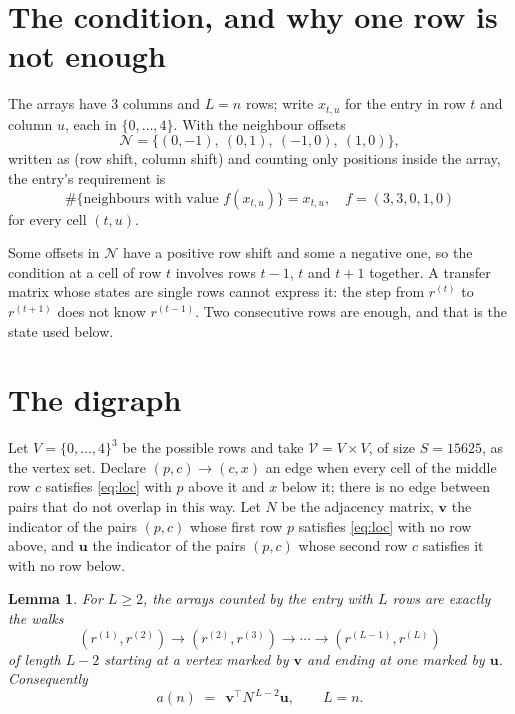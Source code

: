 \documentclass[11pt,a4paper]{article}
\theoremstyle{plain}
\newtheorem{lemma}[theorem]{Lemma}
\theoremstyle{definition}
\begin{document}
\section{The condition, and why one row is not enough}

The arrays have $3$ columns and $L=n$ rows; write $x_{t,u}$ for the entry in
row $t$ and column $u$, each in $\{0,\dots,4\}$. With the neighbour offsets
\[
\mathcal N=\{(0,-1),\ (0,1),\ (-1,0),\ (1,0)\},
\]
written as (row shift, column shift) and counting only positions inside the array, the
entry's requirement is
\begin{equation}\label{eq:loc}
\#\{\text{neighbours with value }f(x_{t,u})\}=x_{t,u},\quad f=(3,3,0,1,0)
\end{equation}
for every cell $(t,u)$.

Some offsets in $\mathcal N$ have a positive row shift and some a negative one, so the
condition at a cell of row $t$ involves rows $t-1$, $t$ and $t+1$ together. A transfer
matrix whose states are single rows cannot express it: the step from $r^{(t)}$ to
$r^{(t+1)}$ does not know $r^{(t-1)}$. Two consecutive rows are enough, and that is
the state used below.

\section{The digraph}

Let $V=\{0,\dots,4\}^{3}$ be the possible rows and take
$\mathcal V=V\times V$, of size $S=15625$, as the vertex set. Declare $(p,c)\to(c,x)$ an edge
when every cell of the middle row $c$ satisfies \eqref{eq:loc} with $p$ above it and $x$
below it; there is no edge between pairs that do not overlap in this way. Let $N$ be the
adjacency matrix, $\mathbf{v}$ the indicator of the pairs $(p,c)$ whose first row $p$
satisfies \eqref{eq:loc} with no row above, and $\mathbf{u}$ the indicator of
the pairs $(p,c)$ whose second row $c$ satisfies it with no row below.

\begin{lemma}\label{lem:walk}
For $L\ge2$, the arrays counted by the entry with $L$ rows are exactly the walks
\[
(r^{(1)},r^{(2)})\to(r^{(2)},r^{(3)})\to\cdots\to(r^{(L-1)},r^{(L)})
\]
of length $L-2$ starting at a vertex marked by $\mathbf{v}$ and ending at one marked by
$\mathbf{u}$. Consequently
\[
a(n)\;=\;\,\mathbf{v}^{\!\top}N^{\,L-2}\mathbf{u},\qquad L=n .
\]
\end{lemma}
\end{document}
